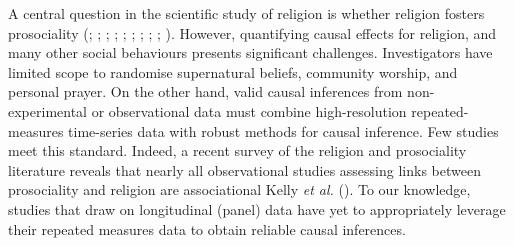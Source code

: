 \documentclass[
  single column]{article}
\begin{document}
A central question in the scientific study of religion is whether
religion fosters prosociality (; ;
;
;
;
; ; ;
;
). However,
quantifying causal effects for religion, and many other social
behaviours presents significant challenges. Investigators have limited
scope to randomise supernatural beliefs, community worship, and personal
prayer. On the other hand, valid causal inferences from non-experimental
or observational data must combine high-resolution repeated-measures
time-series data with robust methods for causal inference. Few studies
meet this standard. Indeed, a recent survey of the religion and
prosociality literature reveals that nearly all observational studies
assessing links between prosociality and religion are associational
Kelly \emph{et al.} (). To our
knowledge, studies that draw on longitudinal (panel) data have yet to
appropriately leverage their repeated measures data to obtain reliable
causal inferences.
\end{document}
